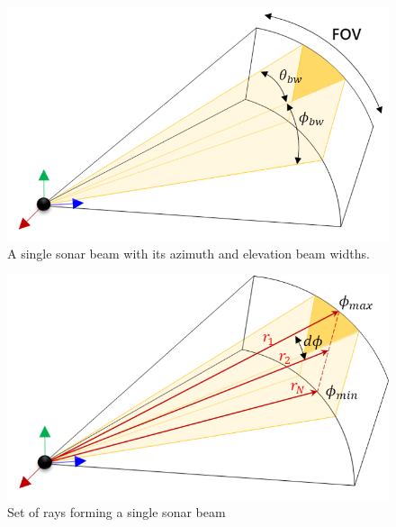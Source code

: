 \documentclass[utf8]{frontiersSCNS} %
\begin{document}
\begin{figure}[ht]
  \centering
  \includegraphics[width=\columnwidth]{images/single_sonar_beam.png}
  \caption{A single sonar beam with its azimuth and elevation beam widths.}
  \label{fig:single_sonar_beam}
\end{figure} 

\begin{figure}[ht]
  \centering
  \includegraphics[width=\columnwidth]{images/rays.png}
  \caption{Set of rays forming a single sonar beam}
  \label{fig:rays}
\end{figure} 
\end{document}
